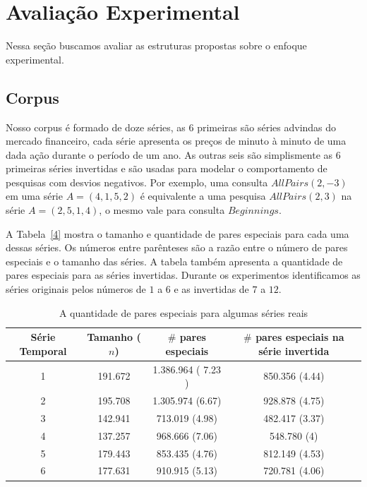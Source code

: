 \documentclass[dissertacao, brazil]{ThesisPUC}
\begin{document}
\section{Avaliação Experimental}

Nessa seção buscamos avaliar as estruturas propostas sobre o enfoque experimental.


\subsection{Corpus}

Nosso corpus é formado de doze séries, as 6 primeiras são séries advindas do mercado financeiro, 
cada série apresenta os preços de minuto à minuto de uma dada ação durante o período de um ano. 
As outras seis são simplismente as 6 primeiras séries invertidas e são usadas para modelar
o comportamento de pesquisas com desvios negativos. Por exemplo, uma consulta $AllPairs(2, -3)$
em uma série $A=(4, 1, 5, 2)$ é equivalente a uma pesquisa $AllPairs(2, 3)$ na série $A=(2, 5, 1, 4)$,
o mesmo vale para consulta $Beginnings$.

A Tabela~\ref{4} mostra o tamanho e quantidade de pares especiais para cada uma dessas séries.
Os números entre parênteses são a razão entre o número de pares especiais e o tamanho das séries.
A tabela também apresenta a quantidade de pares especiais para as séries invertidas. Durante
os experimentos identificamos as séries originais pelos números de $1$ a $6$ e as invertidas
de $7$ a $12$.
 
\begin{table}
\small
\begin{center}
\begin{tabular}{|c|c|c|c|}
\hline
 {\bf Série Temporal}  & {\bf Tamanho} ($n$) & {\bf $\#$ pares especiais} & {\bf $\# $ pares especiais na série invertida} \\ 
\hline
 1 & 191.672   & 1.386.964 ( 7.23 ) &  850.356 (4.44) \\
\hline
 2 & 195.708 & 1.305.974  (6.67) & 928.878 (4.75)\\
\hline
 3 & 142.941 &   713.019 (4.98) & 482.417  (3.37) \\
\hline
 4 & 137.257 &  968.666  (7.06) &  548.780 (4)\\
\hline
 5 & 179.443 & 853.435 (4.76) &  812.149 (4.53) \\
\hline
6  &  177.631 &  910.915 (5.13) &  720.781  (4.06) \\ \hline
\end{tabular}
\end{center}
\label{tab:Special-pairs}
\caption{A quantidade de pares especiais para algumas séries reais}
\normalsize
\end{table}
\end{document}
